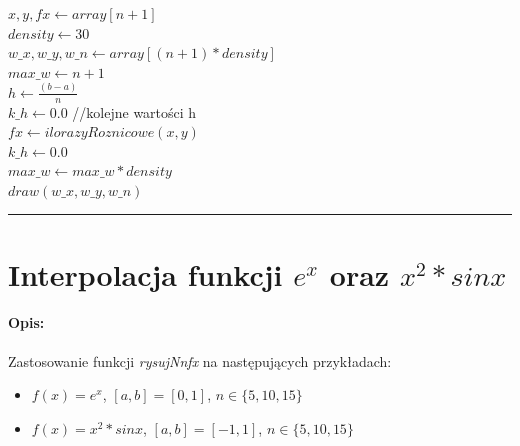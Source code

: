 \documentclass{article}
\begin{document}
\begin{algorithm}[H]
	\vspace{0.3cm}
	$x,y,fx \gets array[n+1]$\\
	$density \gets 30$\\
	$w\_x,w\_y,w\_n \gets array[(n+1)*density]$\\
	$max\_w \gets n+1$\\
	$h \gets \frac{(b-a)}{n}$\\
	$k\_h \gets 0.0$  //kolejne wartości h\\
	$fx \gets ilorazyRoznicowe(x,y)$\\
	
	$k\_h \gets 0.0$\\
	$max\_w \gets max\_w * density$\\
	$draw(w\_x,w\_y,w\_n)$
\end{algorithm}
\hrule
\section*{Interpolacja funkcji $e^x$ oraz $x^2*sinx$}
\noindent \textbf{Opis: } \\\\
Zastosowanie funkcji \textit{rysujNnfx} na następujących przykładach:
\begin{itemize}
	\item $f(x) = e^x$, $[a,b] = [0,1]$, $n \in \{5,10,15\}$
	\item $f(x) = x^2*sinx$, $[a,b] = [-1,1]$, $n \in \{5,10,15\}$
\end{itemize}
\end{document}
